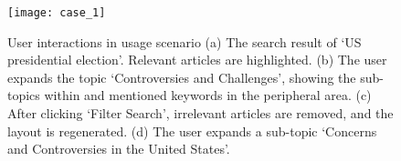 \begin{figure}%
    \centering
    \texttt{[image: case\_1]}
    \caption{User interactions in usage scenario 
    (a) The search result of `US presidential election'. Relevant articles are highlighted.
    (b) The user expands the topic `Controversies and Challenges', showing the sub-topics within and mentioned keywords in the peripheral area.
    (c) After clicking `Filter Search', irrelevant articles are removed, and the layout is regenerated.
    (d) The user expands a sub-topic `Concerns and Controversies in the United States'.
    }%
    \label{fig: case_1}%
\end{figure}


